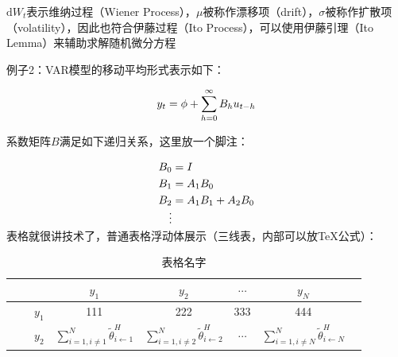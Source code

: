 {$\text{d}W_t$表示维纳过程（Wiener Process），$\mu$被称作漂移项（drift），$\sigma$被称作扩散项（volatility），因此也符合伊藤过程（Ito Process），可以使用伊藤引理（Ito Lemma）来辅助求解随机微分方程

例子2：VAR模型\cite{sims1980}的移动平均形式表示如下：%

\begin{equation}
	\label{VAR(p)模型移动平均形式}
	\setlength\abovedisplayshortskip{-0.3cm}
	\setlength\belowdisplayshortskip{0.5cm}
		{y}_t={\phi}+\sum^\infty_{h=0}{B}_h{u}_{t-h}
\end{equation}

系数矩阵$B$满足如下递归关系，这里放一个脚注\protect\footnotemark[1]： %

\begin{equation}
	\nonumber %
	\setlength\abovedisplayshortskip{-0.3cm}
	\setlength\belowdisplayshortskip{0.5cm}
		\begin{aligned} %
		{B}_0 &= {I} \\
		{B}_1 &= {A}_1{B}_0 \\
		{B}_2 &= {A}_1{B}_1 + {A}_2{B}_0 \\[-5pt] %
		\vdots\\[-10pt] %
		\end{aligned}
\end{equation}


表格就很讲技术了，普通表格浮动体展示（三线表，内部可以放TeX公式）：

\begin{table}[htbp]
	\setlength{\abovecaptionskip}{0.1cm}
	\setlength{\belowcaptionskip}{-0.1cm}
	\centering %
	\caption{表格名字}
		\begin{tabular*}{\hsize}{@{\extracolsep{\fill}}cccccc}
			\toprule %
				& $y_1$ & $y_2$ & $\cdots$ & $y_{N}$\\[2pt] %
			\hline %
			$\qquad y_1$ & 111 & 222 & 333 & 444\\[2pt] %
			$\qquad y_2$ & $\sum^N_{i=1,i\neq 1}\widetilde{\theta}^H_{i\leftarrow 1}$ & $\sum^N_{i=1,i\neq 2}\widetilde{\theta}^H_{i\leftarrow 2}$ & $\cdots$ & $\sum^N_{i=1,i\neq N}\widetilde{\theta}^H_{i\leftarrow N}$\\[2pt]
			\bottomrule %
		\end{tabular*}
	\label{溢出表}
\end{table}

}
